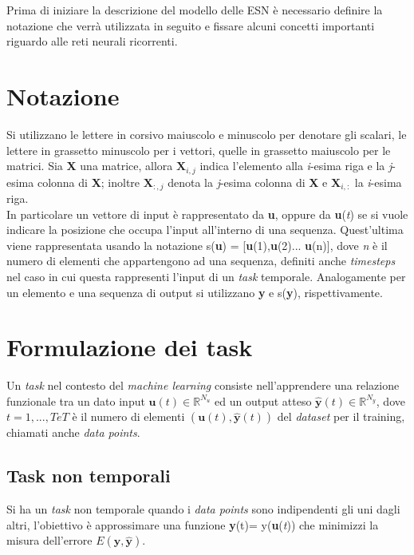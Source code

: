 Prima di iniziare la descrizione del modello delle ESN è necessario definire la notazione che verrà utilizzata in seguito e fissare alcuni concetti importanti riguardo alle reti neurali ricorrenti.

\section{Notazione}\label{sec:notazione}
Si utilizzano le lettere in corsivo maiuscolo e minuscolo per denotare gli scalari, le lettere in grassetto minuscolo per i vettori, quelle in grassetto maiuscolo per le matrici.
Sia \textbf{X}  una matrice, allora $\textbf{X}_{i,j}$ indica l'elemento alla \textit{i}-esima riga e la \textit{j}-esima colonna di \textbf{X}; inoltre  $\textbf{X}_{:,j}$ denota la \textit{j}-esima colonna di \textbf{X} e $\textbf{X}_{i,:}$ la \textit{i}-esima riga.\\
In particolare un vettore di input è rappresentato da \textbf{u}, oppure da \textbf{u}(\textit{t}) se si vuole  indicare la posizione che occupa l'input all'interno di una sequenza. Quest'ultima viene rappresentata usando la notazione s(\textbf{u}) = [\textbf{u}(1),\textbf{u}(2)... \textbf{u}(n)], dove \textit{n} è il numero di elementi che appartengono ad una sequenza, definiti anche \textit{timesteps} nel caso in cui questa rappresenti l'input di un \textit{task} temporale. Analogamente per un elemento e una sequenza di output si utilizzano \textbf{y} e s(\textbf{y}), rispettivamente.

\section{Formulazione dei task}\label{sec:formproblema}
Un \textit{task} nel contesto del \textit{machine learning} consiste nell'apprendere una relazione funzionale tra un dato input $ \mathbf{u}(\mathit{t}) \in \mathbb{R}^{N_{u}} $ ed un output atteso $ \hat{\mathbf{y}}(\mathit{t}) \in \mathds{R}^{N_y} $, dove $ \mathit{t}=1,...,\mathit{T} e \mathit{T} $ è il numero di elementi $ {(\mathbf{u}(\mathit{t}),\hat{\mathbf{y}}(\mathit{t}))} $ del \textit{dataset} per il training, chiamati anche \textit{data points}.

\subsection{Task non temporali}\label{sec:tnt}
Si ha un \textit{task} non temporale quando i \textit{data points} sono indipendenti gli uni dagli altri, l'obiettivo è approssimare una funzione \textbf{y}(t)= y(\textbf{u}(\textit{t})) che minimizzi la misura dell'errore $E(\mathbf{y},\hat{\mathbf{y}})$.

